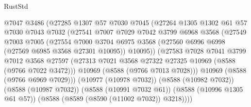 \begin{lexlean}{RustStd}
\begin{coremodule}
                              @7047
                              @3486
                              (@27285
                                @1307
                                @57
                                @7030
                                @7045
                                (@27264
                                  @1305
                                  @1302
                                  @61
                                  @57
                                  @7030
                                  @7043
                                  @7032
                                  (@27541
                                    @7007
                                    @7029
                                    @7042
                                    @3799
                                    @6968
                                    @3568
                                    (@27549
                                      @7003
                                      @7005
                                      (@27554
                                        @7000
                                        @3704
                                        @6975
                                        @3568
                                        (@27560 @6996 @6998 (@27569 @6985 @3568 @27301 @10095))
                                        @10095))
                                    (@27583
                                      @7028
                                      @7041
                                      @3799
                                      @7012
                                      @3568
                                      @27597
                                      (@27313
                                        @7021
                                        @3568
                                        @27322
                                        @27325
                                        @10969
                                        (@8588 (@9766 @7022 @3472)))
                                      @10969
                                      (@8588 (@9766 @7013 @7028)))
                                    @10969
                                    (@8588 (@9766 @6969 @7029)))
                                  (@10977 (@10978 @7032))
                                  (@8588 (@10982 @7032))
                                  (@8588 (@10987 @7032))
                                  (@8588 (@10991 @7032 @61))
                                  (@8588 (@10996 @1305 @61 @57))
                                  (@8588 (@8589 (@8590 (@11002 @7032)) @3218))))

\end{coremodule}
\end{lexlean}
